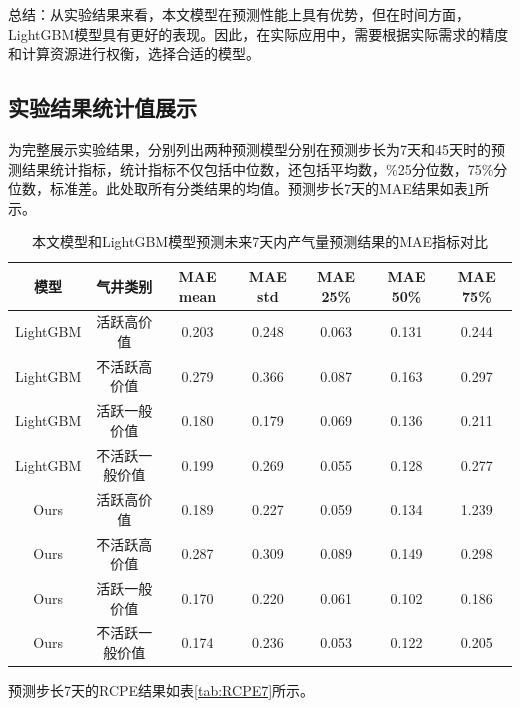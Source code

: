 总结：从实验结果来看，本文模型在预测性能上具有优势，但在时间方面，LightGBM模型具有更好的表现。因此，在实际应用中，需要根据实际需求的精度和计算资源进行权衡，选择合适的模型。
\subsection{实验结果统计值展示}
为完整展示实验结果，分别列出两种预测模型分别在预测步长为7天和45天时的预测结果统计指标，统计指标不仅包括中位数，还包括平均数，\%25分位数，75\%分位数，标准差。此处取所有分类结果的均值。预测步长7天的MAE结果如表\ref{tab:MAE7}所示。
\begin{table}[H]
    \renewcommand{\arraystretch}{1.5}
    \centering
    \caption{本文模型和LightGBM模型预测未来7天内产气量预测结果的MAE指标对比}
    \label{tab:MAE7}
    \begin{tabular}{|c|c|c|c|c|c|c|}
    \hline
    模型     & 气井类别 & MAE mean & MAE std & MAE 25\% & MAE 50\% & MAE 75\% \\ \hline
    LightGBM  &活跃高价值       &0.203     & 0.248   & 0.063    & 0.131     &0.244 \\ \hline 
    LightGBM & 不活跃高价值      & 0.279    & 0.366   & 0.087    & 0.163    & 0.297    \\ \hline
    LightGBM & 活跃一般价值     & 0.180    & 0.179   & 0.069    & 0.136    & 0.211    \\ \hline
    LightGBM & 不活跃一般价值      & 0.199    & 0.269   & 0.055    & 0.128    & 0.277    \\ \hline
    Ours      & 活跃高价值         & 0.189    &0.227    &0.059     & 0.134     &1.239  \\ \hline
    Ours       & 不活跃高价值      & 0.287    & 0.309   & 0.089    & 0.149    & 0.298    \\ \hline
    Ours      & 活跃一般价值     & 0.170    & 0.220   & 0.061    & 0.102    & 0.186    \\ \hline
    Ours     & 不活跃一般价值     & 0.174    & 0.236   & 0.053    & 0.122    & 0.205    \\ \hline
    \end{tabular}
\end{table}
预测步长7天的RCPE结果如表\ref{tab:RCPE7}所示。

